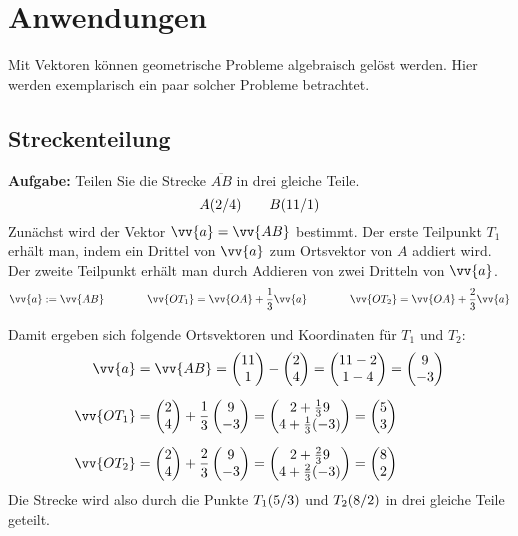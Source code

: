 \newpage
\section{Anwendungen}

Mit Vektoren können geometrische Probleme algebraisch gelöst werden. Hier werden
exemplarisch ein paar solcher Probleme betrachtet.

\subsection{Streckenteilung}
\textbf{Aufgabe:} Teilen Sie die Strecke $\overline{AB}$ in drei gleiche Teile.
\[
  \pxy[A]{2,4} \qquad \pxy[B]{11,1}
\]
Zunächst wird der Vektor $\vv{a} = \vv{AB}$ bestimmt. Der erste Teilpunkt
$T_{1}$ erhält man, indem ein Drittel von $\vv{a}$ zum Ortsvektor von $A$
addiert wird. Der zweite Teilpunkt erhält man durch Addieren von zwei Dritteln
von $\vv{a}$.
\[
  \vv{a} := \vv{AB} \qquad\qquad \vv{OT_{1}} = \vv{OA} + \frac{1}{3}\vv{a} \qquad\qquad \vv{OT_{2}} = \vv{OA} + \frac{2}{3}\vv{a}
\]
\begin{center}
\end{center}
Damit ergeben sich folgende Ortsvektoren und Koordinaten für $T_{1}$ und $T_{2}$:
\begin{align*}
       \vv{a} &= \vv{AB} = \vxy{11,1} - \vxy{2,4} = \vxy{11-2,1-4} = \vxy{9,-3} \\[2mm]
  \vv{OT_{1}} &= \vxy{2,4}+\frac{1}{3}\vxy{9,-3} = \vxy{2+\frac{1}{3}9,4+\frac{1}{3}(-3)} = \vxy{5,3} \\[2mm]
  \vv{OT_{2}} &= \vxy{2,4}+\frac{2}{3}\vxy{9,-3} = \vxy{2+\frac{2}{3}9,4+\frac{2}{3}(-3)} = \vxy{8,2}
\end{align*}
Die Strecke wird also durch die Punkte $\pxy[T_{1}]{5,3}$ und $\pxy[T_{2}]{8,2}$ in drei gleiche Teile geteilt.

